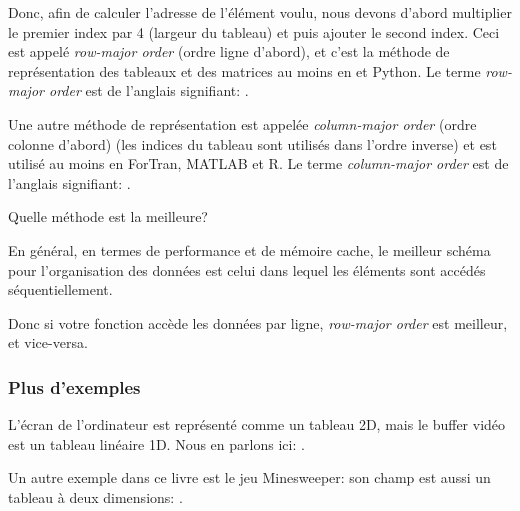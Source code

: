 
Donc, afin de calculer l'adresse de l'élément voulu, nous devons d'abord multiplier
le premier index par 4 (largeur du tableau) et puis ajouter le second index.
Ceci est appelé \emph{row-major order} (ordre ligne d'abord),
et c'est la méthode de représentation des tableaux et des matrices au moins en \CCpp
et Python.
Le terme \emph{row-major order} est de l'anglais signifiant: .

Une autre méthode de représentation est appelée \emph{column-major order} (ordre colonne
d'abord) (les indices du tableau sont utilisés dans l'ordre inverse) et est utilisé
au moins en ForTran, MATLAB et R.
Le terme \emph{column-major order} est de l'anglais signifiant: .

Quelle méthode est la meilleure?

En général, en termes de performance et de mémoire cache, le meilleur schéma pour
l'organisation des données est celui dans lequel les éléments sont accédés séquentiellement.

Donc si votre fonction accède les données par ligne, \emph{row-major order} est meilleur,
et vice-versa.






\subsubsection{Plus d'exemples}

L'écran de l'ordinateur est représenté comme un tableau 2D, mais le buffer vidéo
est un tableau linéaire 1D.
Nous en parlons ici: .

Un autre exemple dans ce livre est le jeu Minesweeper: son champ est aussi un tableau
à deux dimensions: .

